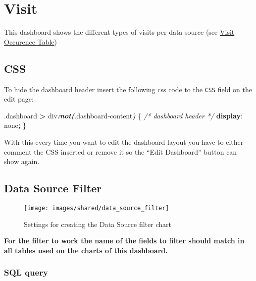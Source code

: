 \documentclass[
]{book}
\newenvironment{Shaded}{\begin{snugshade}}{\end{snugshade}}
\newcommand{\CommentTok}[1]{\textcolor[rgb]{0.56,0.35,0.01}{\textit{#1}}}
\newcommand{\DecValTok}[1]{\textcolor[rgb]{0.00,0.00,0.81}{#1}}
\newcommand{\FunctionTok}[1]{\textcolor[rgb]{0.00,0.00,0.00}{#1}}
\newcommand{\InformationTok}[1]{\textcolor[rgb]{0.56,0.35,0.01}{\textbf{\textit{#1}}}}
\newcommand{\KeywordTok}[1]{\textcolor[rgb]{0.13,0.29,0.53}{\textbf{#1}}}
\newcommand{\NormalTok}[1]{#1}
\newcommand{\OperatorTok}[1]{\textcolor[rgb]{0.81,0.36,0.00}{\textbf{#1}}}
\begin{document}
\hypertarget{visit}{%
\section{Visit}\label{visit}}

This dashboard shows the different types of visits per data source (see \href{https://ohdsi.github.io/CommonDataModel/cdm531.html\#visit_occurrence}{Visit Occurence Table})

\hypertarget{css-3}{%
\subsection*{CSS}\label{css-3}}

To hide the dashboard header insert the following css code to the \texttt{CSS} field on the edit page:

\begin{Shaded}
\begin{Highlighting}[]
\FunctionTok{.dashboard} \OperatorTok{\textgreater{}}\NormalTok{ div}\InformationTok{:not(}\FunctionTok{.dashboard{-}content}\InformationTok{)}\NormalTok{ \{  }\CommentTok{/* dashboard header */}
  \KeywordTok{display}\NormalTok{: }\DecValTok{none}\OperatorTok{;}
\NormalTok{\}}
\end{Highlighting}
\end{Shaded}

With this every time you want to edit the dashboard layout you have to either comment the CSS inserted
or remove it so the ``Edit Dashboard'' button can show again.

\hypertarget{data-source-filter-2}{%
\subsection*{Data Source Filter}\label{data-source-filter-2}}

\begin{figure}
\texttt{[image: images/shared/data\_source\_filter]} \caption{Settings for creating the Data Source filter chart}\label{fig:dataSourceFilter}
\end{figure}

\textbf{For the filter to work the name of the fields to filter should match in all tables used on the charts of this dashboard.}

\hypertarget{sql-query-15}{%
\subsubsection*{SQL query}\label{sql-query-15}}
\end{document}
